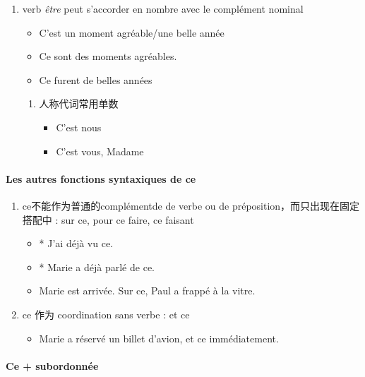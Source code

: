 \documentclass[UTF8]{report}
\begin{document}
\begin{enumerate}
    \item verb \textit{être} peut s’accorder en nombre avec le complément nominal
    \begin{itemize}
        \item C’est un moment agréable/une belle année
        \item Ce sont des moments agréables.
        \item Ce furent de belles années
    \end{itemize}
    \begin{enumerate}
        \item 人称代词常用单数
        \begin{itemize}
            \item C’est nous
            \item C’est vous, Madame
        \end{itemize}
    \end{enumerate}
\end{enumerate}

\paragraph{Les autres fonctions syntaxiques de ce}

\begin{enumerate}
    \item ce不能作为普通的complémentde de verbe ou de préposition，而只出现在固定搭配中 : sur ce, pour ce faire, ce faisant
    \begin{itemize}
        \item * J’ai déjà vu ce.
        \item * Marie a déjà parlé de ce.
        \item Marie est arrivée. Sur ce, Paul a frappé à la vitre.
    \end{itemize}
    \item ce 作为 coordination sans verbe : et ce
    \begin{itemize}
        \item Marie a réservé un billet d’avion, et ce immédiatement.
    \end{itemize}
\end{enumerate}

\paragraph{Ce + subordonnée}
\end{document}
